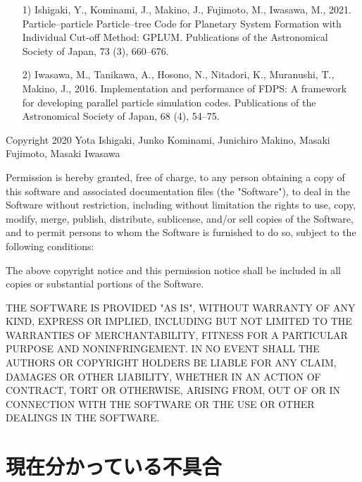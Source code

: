 \documentclass[12pt,a4paper,dvipdfmx]{jsarticle}
\begin{document}
\begin{itemize}
\item[1)]
Ishigaki, Y., Kominami, J., Makino, J., Fujimoto, M., Iwasawa, M., 2021. 
Particle--particle Particle--tree Code for Planetary System Formation with Individual Cut-off Method: GPLUM. Publications of the Astronomical Society of Japan, 73 (3), 660--676.

\item[2)]
Iwasawa, M., Tanikawa, A., Hosono, N., Nitadori, K., Muranushi, T., Makino, J., 2016. Implementation and performance of FDPS: A framework for developing parallel particle simulation codes. Publications of the Astronomical Society of Japan, 68 (4), 54--75.
\end{itemize}

Copyright 2020 Yota Ishigaki, Junko Kominami, Junichiro Makino, Masaki Fujimoto, Masaki Iwasawa

Permission is hereby granted, free of charge, to any person obtaining a copy of this software and associated documentation files (the "Software"), to deal in the Software without restriction, including without limitation the rights to use, copy, modify, merge, publish, distribute, sublicense, and/or sell copies of the Software, and to permit persons to whom the Software is furnished to do so, subject to the following conditions:

The above copyright notice and this permission notice shall be included in all copies or substantial portions of the Software.

THE SOFTWARE IS PROVIDED "AS IS", WITHOUT WARRANTY OF ANY KIND, EXPRESS OR IMPLIED, INCLUDING BUT NOT LIMITED TO THE WARRANTIES OF MERCHANTABILITY, FITNESS FOR A PARTICULAR PURPOSE AND NONINFRINGEMENT. IN NO EVENT SHALL THE AUTHORS OR COPYRIGHT HOLDERS BE LIABLE FOR ANY CLAIM, DAMAGES OR OTHER LIABILITY, WHETHER IN AN ACTION OF CONTRACT, TORT OR OTHERWISE, ARISING FROM, OUT OF OR IN CONNECTION WITH THE SOFTWARE OR THE USE OR OTHER DEALINGS IN THE SOFTWARE.


\section{現在分かっている不具合}
\end{document}
